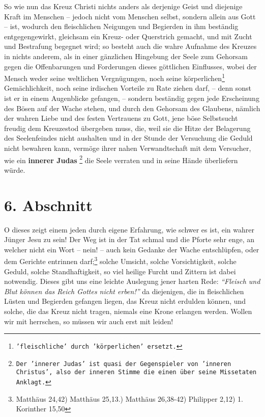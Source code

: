 \medskip

So wie nun das Kreuz Christi nichts anders als derjenige Geist und diejenige
Kraft im Menschen -- jedoch nicht vom Menschen selbst, sondern allein aus Gott
--
ist, wodurch den fleischlichen Neigungen und Begierden in ihm beständig
entgegengewirkt, gleichsam ein Kreuz- oder Querstrich gemacht, und mit Zucht und
Bestrafung begegnet wird; so besteht auch die wahre Aufnahme des Kreuzes in
nichts anderem, als in einer gänzlichen Hingebung der Seele zum Gehorsam gegen
die Offenbarungen und Forderungen dieses göttlichen Einflusses, wobei der Mensch
weder seine weltlichen Vergnügungen, noch seine
körperlichen\footnote{\texttt{'fleischliche' durch 'körperlichen' ersetzt.}}
Gemächlichkeit,
noch seine irdischen Vorteile zu Rate ziehen darf, -- denn sonst ist er in
einem Augenblicke gefangen, -- sondern beständig gegen jede Erscheinung des
Bösen auf der Wache stehen, und durch den Gehorsam des Glaubens, nämlich der
wahren Liebe und des festen Vertrauens zu Gott, jene böse Selbstsucht freudig
dem Kreuzestod übergeben muss, die, weil sie die Hitze der Belagerung des
Seelenfeindes nicht aushalten und in der Stunde der Versuchung die Geduld nicht
bewahren kann, vermöge ihrer nahen Verwandtschaft mit dem Versucher, wie ein
\textbf{innerer Judas}
\footnote{\texttt{Der 'innerer Judas' ist quasi der Gegenspieler von 'inneren
Christus', also der inneren Stimme die einen über seine Missetaten Anklagt.}}
die Seele verraten und in seine Hände überliefern würde.



\section{6. Abschnitt} \label{kap3_ab6}

O dieses zeigt einem jeden durch eigene Erfahrung, wie schwer es ist, ein wahrer
Jünger Jesu zu sein! Der Weg ist in der Tat schmal und die Pforte sehr enge, an
welcher nicht ein Wort -- nein! -- auch kein Gedanke der Wache entschlüpfen,
oder
dem Gerichte entrinnen darf;\footnote{Matthäus 24,42) Matthäus 25,13.) Matthäus
26,38-42)
Philipper 2,12) 1. Korinther 15,50}
solche Umsicht, solche Vorsichtigkeit, solche Geduld,
solche Standhaftigkeit, so viel heilige Furcht und Zittern ist dabei notwendig.
Dieses gibt uns eine leichte Auslegung jener harten Rede:
\textit{"`Fleisch und Blut können das Reich Gottes nicht erben!"'}
da diejenigen, die in fleischlichen
Lüsten und Begierden gefangen liegen, das Kreuz nicht erdulden können, und
solche, die das Kreuz nicht tragen, niemals eine Krone erlangen werden. Wollen
wir mit herrschen, so müssen wir auch erst mit leiden!




